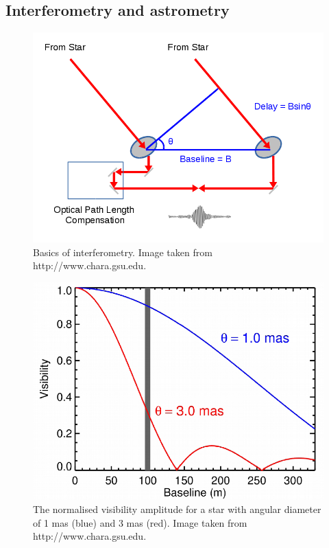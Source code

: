     \subsection{Interferometry and astrometry}
    
      \begin{figure}
    \includegraphics[width=\textwidth]{3-images/interferometer_basic}
    \caption{Basics of interferometry. Image taken from http://www.chara.gsu.edu.}
    \label{fig:interferometry_basics}
    \end{figure}
    
    \begin{figure}
    \includegraphics[width=\textwidth]{3-images/vis_diam}
    \caption{The normalised visibility amplitude for a star with angular diameter of 1 mas (blue) and 3 mas (red). Image taken from http://www.chara.gsu.edu.}
    \label{interferometry_visibility}
    \end{figure}
    
